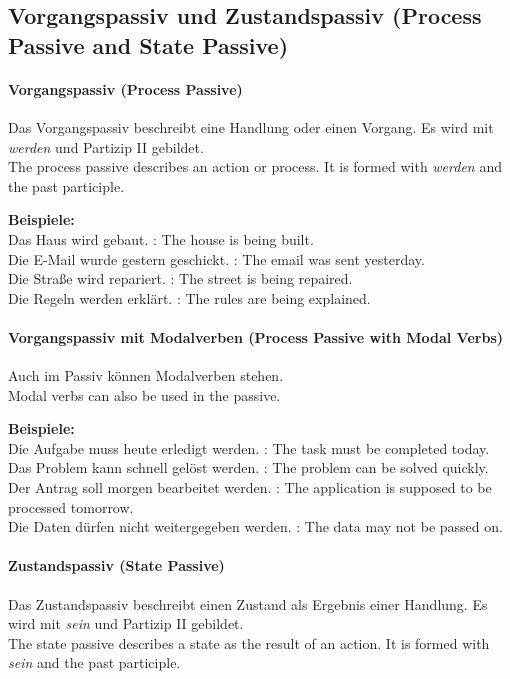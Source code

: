 \documentclass[a4paper]{article}
\begin{document}
    \subsection{Vorgangspassiv und Zustandspassiv {\small (Process Passive and State Passive)}}
        
        \paragraph{Vorgangspassiv {\small (Process Passive)}}
            Das Vorgangspassiv beschreibt eine Handlung oder einen Vorgang. Es wird mit \textit{werden} und Partizip II gebildet.\\
            The process passive describes an action or process. It is formed with \textit{werden} and the past participle.
            
            \textbf{Beispiele:}\\
            Das Haus wird gebaut. : The house is being built.\\
            Die E-Mail wurde gestern geschickt. : The email was sent yesterday.\\
            Die Straße wird repariert. : The street is being repaired.\\
            Die Regeln werden erklärt. : The rules are being explained.
        
        \paragraph{Vorgangspassiv mit Modalverben {\small (Process Passive with Modal Verbs)}}
            Auch im Passiv können Modalverben stehen.\\
            Modal verbs can also be used in the passive.
            
            \textbf{Beispiele:}\\
            Die Aufgabe muss heute erledigt werden. : The task must be completed today.\\
            Das Problem kann schnell gelöst werden. : The problem can be solved quickly.\\
            Der Antrag soll morgen bearbeitet werden. : The application is supposed to be processed tomorrow.\\
            Die Daten dürfen nicht weitergegeben werden. : The data may not be passed on.
        
        \paragraph{Zustandspassiv {\small (State Passive)}}
            Das Zustandspassiv beschreibt einen Zustand als Ergebnis einer Handlung. Es wird mit \textit{sein} und Partizip II gebildet.\\
            The state passive describes a state as the result of an action. It is formed with \textit{sein} and the past participle.
            
\end{document}
